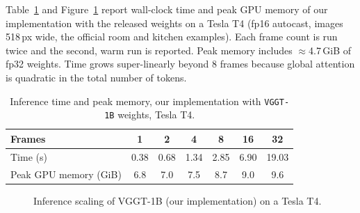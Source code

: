 \documentclass[11pt,a4paper]{article}
\begin{document}
Table~\ref{tab:timing} and Figure~\ref{fig:timing} report wall-clock time and peak GPU memory of our implementation with the
released weights on a Tesla T4 (fp16 autocast, images 518\,px wide, the official room and kitchen examples). Each
frame count is run twice and the second, warm run is reported. Peak memory includes $\approx$4.7\,GiB of fp32 weights. Time
grows super-linearly beyond 8 frames because global attention is quadratic in the total number of tokens.

\begin{table}[htbp]
\centering
\caption{Inference time and peak memory, our implementation with \texttt{VGGT-1B} weights, Tesla T4.}
\label{tab:timing}
\begin{tabular}{lcccccc}
\toprule
Frames & 1 & 2 & 4 & 8 & 16 & 32 \\
\midrule
Time (s)               & 0.38 & 0.68 & 1.34 & 2.85 & 6.90 & 19.03 \\
Peak GPU memory (GiB)  & 6.8  & 7.0  & 7.5  & 8.7  & 9.0  & 9.6 \\
\bottomrule
\end{tabular}
\end{table}

\begin{figure}[htbp]
\centering
{}
\caption{Inference scaling of VGGT-1B (our implementation) on a Tesla T4.}
\label{fig:timing}
\end{figure}
\end{document}
